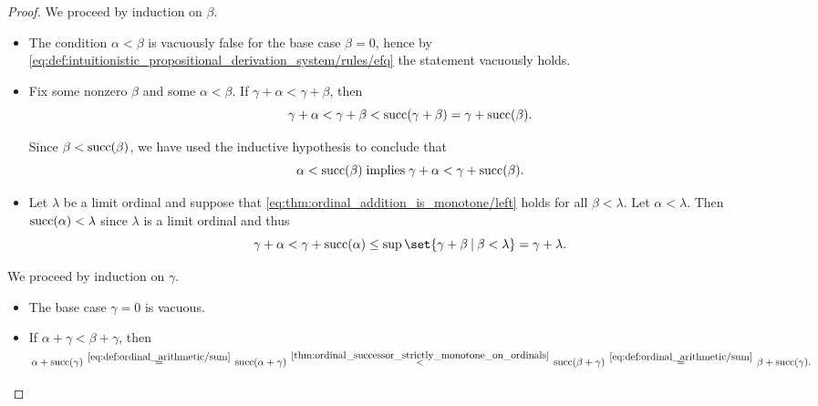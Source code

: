 \begin{proof}
   We proceed by induction on \( \beta \).
  \begin{itemize}
    \item The condition \( \alpha < \beta \) is vacuously false for the base case \( \beta = 0 \), hence by \eqref{eq:def:intuitionistic_propositional_derivation_system/rules/efq} the statement vacuously holds.

    \item Fix some nonzero \( \beta \) and some \( \alpha < \beta \). If \( \gamma + \alpha < \gamma + \beta \), then
    \begin{equation*}
      \gamma + \alpha < \gamma + \beta < \operatorname{succ}(\gamma + \beta) = \gamma + \operatorname{succ}(\beta).
    \end{equation*}

    Since \( \beta < \operatorname{succ}(\beta) \), we have used the inductive hypothesis to conclude that
    \begin{equation*}
      \alpha < \op{succ}(\beta) \T{implies} \gamma + \alpha < \gamma + \op{succ}(\beta).
    \end{equation*}

    \item Let \( \lambda \) be a limit ordinal and suppose that \eqref{eq:thm:ordinal_addition_is_monotone/left} holds for all \( \beta < \lambda \). Let \( \alpha < \lambda \). Then \( \operatorname{succ}(\alpha) < \lambda \) since \( \lambda \) is a limit ordinal and thus
    \begin{equation*}
      \gamma + \alpha
      <
      \gamma + \op{succ}(\alpha)
      \leq
      \sup\set{ \gamma + \beta \given \beta < \lambda }
      =
      \gamma + \lambda.
    \end{equation*}
  \end{itemize}

   We proceed by induction on \( \gamma \).
  \begin{itemize}
    \item The base case \( \gamma = 0 \) is vacuous.
    \item If \( \alpha + \gamma < \beta + \gamma \), then
    \begin{equation*}
      \alpha + \op{succ}(\gamma)
      \reloset {\eqref{eq:def:ordinal_arithmetic/sum}} =
      \op{succ}(\alpha + \gamma)
      \reloset {\ref{thm:ordinal_successor_strictly_monotone_on_ordinals}} <
      \op{succ}(\beta + \gamma)
      \reloset {\eqref{eq:def:ordinal_arithmetic/sum}} =
      \beta + \op{succ}(\gamma).
    \end{equation*}


\end{itemize}
\end{proof}
